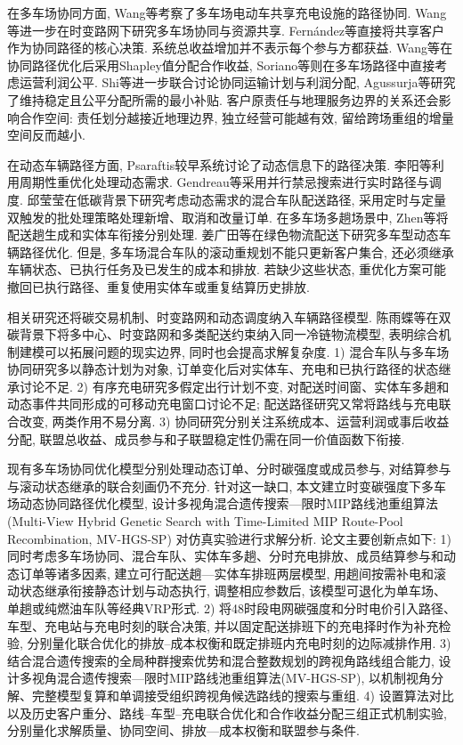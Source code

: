 \documentclass{setp-new}
\begin{document}
在多车场协同方面, Wang等\cite{ref:7}考察了多车场电动车共享充电设施的路径协同.
Wang等\cite{ref:25}进一步在时变路网下研究多车场协同与资源共享.
Fern\'{a}ndez等\cite{ref:49}直接将共享客户作为协同路径的核心决策.
系统总收益增加并不表示每个参与方都获益.
Wang等\cite{ref:7}在协同路径优化后采用Shapley值分配合作收益,
Soriano等\cite{ref:8}则在多车场路径中直接考虑运营利润公平.
Shi等\cite{ref:9}进一步联合讨论协同运输计划与利润分配,
Agussurja等\cite{ref:10}研究了维持稳定且公平分配所需的最小补贴.
客户原责任与地理服务边界的关系还会影响合作空间:
责任划分越接近地理边界, 独立经营可能越有效,
留给跨场重组的增量空间反而越小.

在动态车辆路径方面, Psaraftis\cite{ref:14}较早系统讨论了动态信息下的路径决策.
李阳等\cite{ref:18}利用周期性重优化处理动态需求.
Gendreau等\cite{ref:22}采用并行禁忌搜索进行实时路径与调度.
邱莹莹\cite{ref:71}在低碳背景下研究考虑动态需求的混合车队配送路径,
采用定时与定量双触发的批处理策略处理新增、取消和改量订单.
在多车场多趟场景中, Zhen等\cite{ref:44}将配送趟生成和实体车衔接分别处理.
姜广田等\cite{ref:51}在绿色物流配送下研究多车型动态车辆路径优化.
但是, 多车场混合车队的滚动重规划不能只更新客户集合,
还必须继承车辆状态、已执行任务及已发生的成本和排放.
若缺少这些状态, 重优化方案可能撤回已执行路径、重复使用实体车或重复结算历史排放.

相关研究还将碳交易机制、时变路网和动态调度纳入车辆路径模型.
陈雨蝶等\cite{ref:48}在双碳背景下将多中心、时变路网和多类配送约束纳入同一冷链物流模型,
表明综合机制建模可以拓展问题的现实边界, 同时也会提高求解复杂度.
1) 混合车队与多车场协同研究多以静态计划为对象,
订单变化后对实体车、充电和已执行路径的状态继承讨论不足.
2) 有序充电研究多假定出行计划不变,
对配送时间窗、实体车多趟和动态事件共同形成的可移动充电窗口讨论不足;
配送路径研究又常将路线与充电联合改变, 两类作用不易分离.
3) 协同研究分别关注系统成本、运营利润或事后收益分配,
联盟总收益、成员参与和子联盟稳定性仍需在同一价值函数下衔接.

现有多车场协同优化模型分别处理动态订单、分时碳强度或成员参与,
对结算参与与滚动状态继承的联合刻画仍不充分.
针对这一缺口, 本文建立时变碳强度下多车场动态协同路径优化模型,
设计多视角混合遗传搜索—限时MIP路线池重组算法
(Multi-View Hybrid Genetic Search with Time-Limited MIP Route-Pool Recombination, MV-HGS-SP)
对仿真实验进行求解分析.
论文主要创新点如下:
1) 同时考虑多车场协同、混合车队、实体车多趟、分时充电排放、成员结算参与和动态订单等诸多因素,
建立可行配送趟—实体车排班两层模型,
用趟间按需补电和滚动状态继承衔接静态计划与动态执行,
调整相应参数后, 该模型可退化为单车场、单趟或纯燃油车队等经典VRP形式.
2) 将48时段电网碳强度和分时电价引入路径、车型、充电站与充电时刻的联合决策,
并以固定配送排班下的充电择时作为补充检验,
分别量化联合优化的排放--成本权衡和既定排班内充电时刻的边际减排作用.
3) 结合混合遗传搜索的全局种群搜索优势和混合整数规划的跨视角路线组合能力,
设计多视角混合遗传搜索—限时MIP路线池重组算法(MV-HGS-SP),
以机制视角分解、完整模型复算和单调接受组织跨视角候选路线的搜索与重组.
4) 设置算法对比以及历史客户重分、路线--车型--充电联合优化和合作收益分配三组正式机制实验,
分别量化求解质量、协同空间、排放—成本权衡和联盟参与条件.
\end{document}
